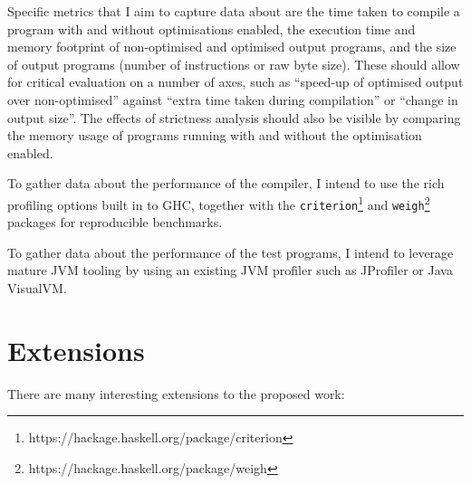 \documentclass[12pt]{article}
\newcommand\monospace[1]{\texttt{#1}}
\begin{document}
Specific metrics that I aim to capture data about are the time taken to compile a program with and without optimisations
enabled, the execution time and memory footprint of non-optimised and optimised output programs, and the size of output
programs (number of instructions or raw byte size). These should allow for critical evaluation on a number of axes, such
as ``speed-up of optimised output over non-optimised'' against ``extra time taken during compilation'' or ``change in
output size''. The effects of strictness analysis should also be visible by comparing the memory usage of programs
running with and without the optimisation enabled.

To gather data about the performance of the compiler, I intend to use the rich profiling options built in to GHC,
together with the \monospace{criterion}\footnote{https://hackage.haskell.org/package/criterion} and
\monospace{weigh}\footnote{https://hackage.haskell.org/package/weigh} packages for reproducible benchmarks.

To gather data about the performance of the test programs, I intend to leverage mature JVM tooling by using an existing
JVM profiler such as JProfiler or Java VisualVM.

\section*{Extensions}

There are many interesting extensions to the proposed work:
\end{document}
